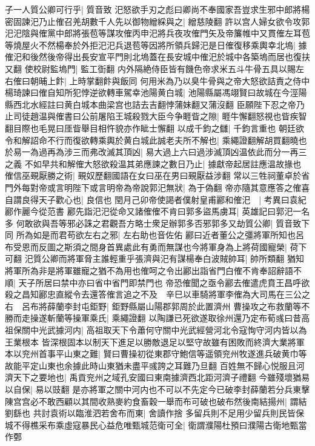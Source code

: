 子一人質公卿可行乎|{
	質音致}
汜怒欲手刃之彪曰卿尚不奉國家吾豈求生邪中郎將楊密固諫汜乃止傕召羌胡數千人先以御物繒綵與之|{
	繒慈陵翻}
許以宫人婦女欲令攻郭汜汜陰與傕黨中郎將張苞等謀攻傕丙申汜將兵夜攻傕門矢及帝簾帷中又貫傕左耳苞等燒屋火不然楊奉於外拒汜汜兵退苞等因將所領兵歸汜是日傕復移乘輿幸北塢|{
	據傕汜和後然後帝得出長安宣平門則北塢蓋在長安城中傕汜於城中各築塢而居也復扶又翻}
使校尉監塢門|{
	監工衘翻}
内外隔絶侍臣皆有饑色帝求米五斗牛骨五具以賜左右傕曰朝晡上飰|{
	上時掌翻飰與飯同}
何用米為乃以臭牛骨與之帝大怒欲詰責之侍中楊琦諫曰傕自知所犯悖逆欲轉車駕幸池陽黄白城|{
	池陽縣屬馮翊賢曰故城在今涇陽縣西北水經註曰黄白城本曲梁宫也詰去吉翻悖蒲妹翻又蒲沒翻}
臣願陛下忍之帝乃止司徒趙温與傕書曰公前屠陷王城殺戮大臣今争睚眥之隙|{
	睚牛懈翻怒視也眥疾智翻目際也毛晃曰厓眥舉目相忤貌亦作眦士懈翻}
以成千鈞之讎|{
	千鈞言重也}
朝廷欲令和解詔命不行而復欲轉乘輿於黄白城此誠老夫所不解也|{
	乘繩證翻解胡買翻曉也}
於易一為過再為涉三而弗改滅其頂凶|{
	易大過上六曰過涉滅頂凶温依此而分一再三之義}
不如早共和解傕大怒欲殺温其弟應諫之數日乃止|{
	據獻帝起居註應温故掾也}
傕信巫覡厭勝之術|{
	覡奴歷翻國語在女曰巫在男曰覡厭益涉翻}
常以三牲祠董卓於省門外每對帝或言明陛下或言明帝為帝說郭汜無狀|{
	為于偽翻}
帝亦隨其意應答之傕喜自謂良得天子歡心也|{
	良信也}
閏月己卯帝使謁者僕射皇甫酈和傕汜　|{
	考異曰袁紀酈作麗今從范書}
酈先詣汜汜從命又諸傕傕不肯曰郭多盜馬虜耳|{
	英雄記曰郭汜一名多}
何敢欲與吾等邪必誅之君觀吾方略士衆足辦郭多否邪郭多又劫質公卿|{
	質音致下同}
所為如是而君苟欲左右之邪|{
	左右助也音佐佑}
酈曰近者董公之彊將軍所知也呂布受恩而反圖之斯須之間身首異處此有勇而無謀也今將軍身為上將荷國寵榮|{
	荷下可翻}
汜質公卿而將軍脅主誰輕重乎張濟與汜有謀楊奉白波賊帥耳|{
	帥所類翻}
猶知將軍所為非是將軍雖寵之猶不為用也傕呵之令出酈出詣省門白傕不肯奉詔辭語不順|{
	天子所居曰禁中亦曰省中省門即禁門也}
帝恐傕聞之亟令酈去傕遣虎賁王昌呼欲殺之昌知酈忠直縱令去還答傕言追之不及　辛巳以車騎將軍李傕為大司馬在三公之右　呂布將薛蘭李封屯鉅野|{
	鉅野縣屬山陽郡郭周於此置濟州}
曹操攻之布救蘭等不勝而走操遂斬蘭等操軍乘氏|{
	乘繩證翻}
以陶謙已死欲遂取徐州還乃定布荀彧曰昔高祖保關中光武據河内|{
	高祖取天下令蕭何守關中光武經營河北令寇恂守河内皆以為王業根本}
皆深根固本以制天下進足以勝敵退足以堅守故雖有困敗而終濟大業將軍本以兖州首事平山東之難|{
	賢曰曹操初從東郡守鮑信等遥領兖州牧遂進兵破黄巾等故能平定山東也余據此時山東猶未盡平彧誇之耳難乃旦翻}
百姓無不歸心悦服且河濟天下之要地也|{
	禹貢兖州之域孔安國曰東南據濟西北距河濟子禮翻}
今雖殘壞猶易以自保|{
	易以豉翻}
是亦將軍之關中河内也不可以不先定今已破李封薛蘭若分兵東擊陳宫宫必不敢西顧以其間收熟麥約食畜穀一舉而布可破也破布然後南結揚州|{
	謂結劉繇也}
共討袁術以臨淮泗若舍布而東|{
	舍讀作捨}
多留兵則不足用少留兵則民皆保城不得樵采布乘虛寇暴民心益危唯甄城范衛可全|{
	衛謂濮陽杜預曰濮陽古衛地甄當作鄄}
